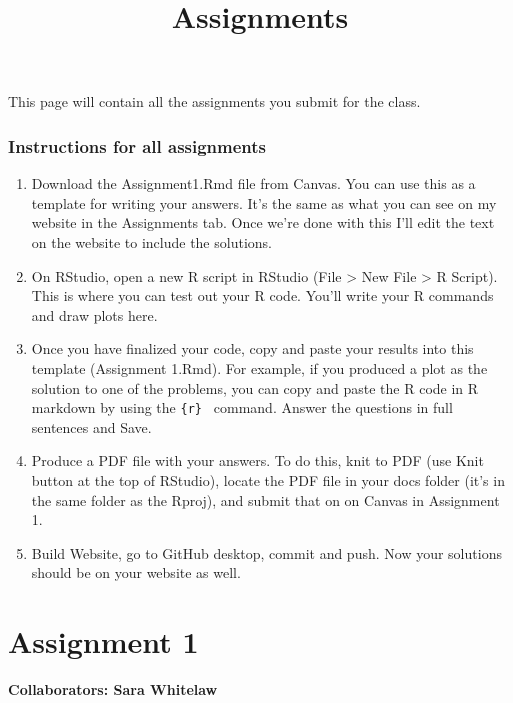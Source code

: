 \documentclass[
]{article}
\title{Assignments}
\author{}
\date{\vspace{-2.5em}}
\begin{document}
\maketitle

This page will contain all the assignments you submit for the class.

\hypertarget{instructions-for-all-assignments}{%
\subsubsection{Instructions for all
assignments}\label{instructions-for-all-assignments}}

\begin{enumerate}
\def\labelenumi{\arabic{enumi}.}
\item
  Download the Assignment1.Rmd file from Canvas. You can use this as a
  template for writing your answers. It's the same as what you can see
  on my website in the Assignments tab. Once we're done with this I'll
  edit the text on the website to include the solutions.
\item
  On RStudio, open a new R script in RStudio (File \textgreater{} New
  File \textgreater{} R Script). This is where you can test out your R
  code. You'll write your R commands and draw plots here.
\item
  Once you have finalized your code, copy and paste your results into
  this template (Assignment 1.Rmd). For example, if you produced a plot
  as the solution to one of the problems, you can copy and paste the R
  code in R markdown by using the
  \texttt{\textasciigrave{}\textasciigrave{}\{r\}\ \textasciigrave{}\textasciigrave{}\textasciigrave{}}
  command. Answer the questions in full sentences and Save.
\item
  Produce a PDF file with your answers. To do this, knit to PDF (use
  Knit button at the top of RStudio), locate the PDF file in your docs
  folder (it's in the same folder as the Rproj), and submit that on on
  Canvas in Assignment 1.
\item
  Build Website, go to GitHub desktop, commit and push. Now your
  solutions should be on your website as well.
\end{enumerate}

\hypertarget{assignment-1}{%
\section{Assignment 1}\label{assignment-1}}

\textbf{Collaborators: Sara Whitelaw }
\end{document}
